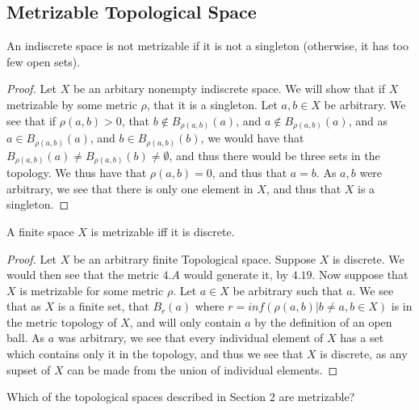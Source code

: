 \subsection{Metrizable Topological Space}

\begin{majorEx}%
    An indiscrete space is not metrizable if it is not a singleton (otherwise,
    it has too few open sets).
\end{majorEx}

\begin{proof}
   Let $X$ be an arbitary nonempty indiscrete space.
   We will show that if $X$ metrizable by some metric $\rho$, that it
   is a singleton. Let $a,b \in X$ be arbitrary. We see that if
   $\rho(a,b)>0$, that $b \notin B_{\rho(a,b)}(a)$, and $a \notin
   B_{\rho(a,b)}(a)$, and as $a \in B_{\rho(a,b)}(a)$, and $b \in
   B_{\rho(a,b)}(b)$, we would have that $B_{\rho(a,b)}(a)\neq
   B_{\rho(a,b)}(b)\neq \emptyset$, and thus there would be three sets
   in the topology. We thus have that $\rho(a,b)=0$, and thus that
   $a=b$. As $a,b$ were arbitrary, we see that there is only one
   element in $X$, and thus that $X$ is a singleton.
\end{proof}

\begin{majorEx}%
    A finite space $X$ is metrizable iff it is discrete.
\end{majorEx}

\begin{proof}
  Let $X$ be an arbitrary finite Topological space. Suppose $X$ is
  discrete. We would then see that the metric $4.A$ would generate it,
  by $4.19$. Now suppose that $X$ is metrizable for some metric
  $\rho$. Let $a\in X$ be 
  arbitrary such that $a$. We see that as $X$ is a finite set, that
  $B_r(a)$ where $r = inf (\rho(a,b)| b\neq a, b\in X )$ is in the
  metric topology of $X$, and will only contain $a$ by the definition
  of an open ball. As $a$ was arbitrary, we see that every individual
  element of $X$ has a set which contains only it in the topology, and
  thus we see that $X$ is discrete, as any supset of $X$ can be made
  from the union of individual elements.
\end{proof}


\begin{minorEx}%
    Which of the topological spaces described in Section 2 are metrizable?
\end{minorEx}


